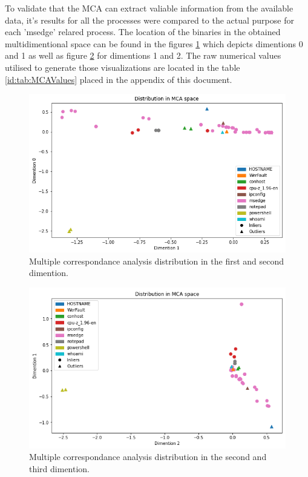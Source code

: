 \documentclass[a4paper,twoside,12pt]{book}
\begin{document}
To validate that the MCA can extract valiable information from the available data, it's results for all
the processes were compared to the actual purpose for each 'msedge' relared process. The location of the
binaries in the obtained multidimentional space can be found in the figures \ref{fig:mca01} which 
depicts dimentions 0 and 1 as well as figure \ref{fig:mca12} for dimentions 1 and 2. The raw numerical 
values utilised to generate those visualizations are located in the table \ref{id:tab:MCAValues} placed 
in the appendix of this document. 


\begin{figure}
	\centering
	\includegraphics[scale=0.9]{images/MCA01}
	\caption{Multiple correspondance analysis distribution in the first and second dimention.}
	\label{fig:mca01}
 \end{figure}

 \begin{figure}
	\centering
	\includegraphics[scale=0.9]{images/MCA12}
	\caption{Multiple correspondance analysis distribution in the second and third dimention.}
	\label{fig:mca12}
 \end{figure}
\end{document}
